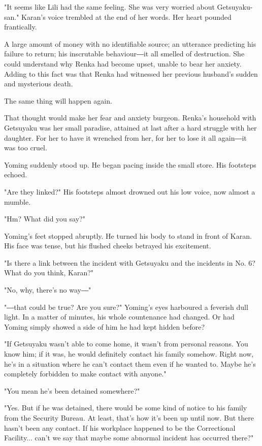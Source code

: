 "It seems like Lili had the same feeling. She was very worried about
Getsuyaku-san." Karan's voice trembled at the end of her words. Her
heart pounded frantically.

A large amount of money with no identifiable source; an utterance
predicting his failure to return; his inscrutable behaviour―it all
smelled of destruction. She could understand why Renka had become upset,
unable to bear her anxiety. Adding to this fact was that Renka had
witnessed her previous husband's sudden and mysterious death.

The same thing will happen again.

That thought would make her fear and anxiety burgeon. Renka's household
with Getsuyaku was her small paradise, attained at last after a hard
struggle with her daughter. For her to have it wrenched from her, for
her to lose it all again―it was too cruel.

Yoming suddenly stood up. He began pacing inside the small store. His
footsteps echoed.

"Are they linked?" His footsteps almost drowned out his low voice, now
almost a mumble.

"Hm? What did you say?"

Yoming's feet stopped abruptly. He turned his body to stand in front of
Karan. His face was tense, but his flushed cheeks betrayed his
excitement.

"Is there a link between the incident with Getsuyaku and the incidents
in No. 6? What do you think, Karan?"

"No, why, there's no way―"

"―that could be true? Are you sure?" Yoming's eyes harboured a feverish
dull light. In a matter of minutes, his whole countenance had changed.
Or had Yoming simply showed a side of him he had kept hidden before?

"If Getsuyaku wasn't able to come home, it wasn't from personal reasons.
You know him; if it was, he would definitely contact his family somehow.
Right now, he's in a situation where he can't contact them even if he
wanted to. Maybe he's completely forbidden to make contact with anyone."

"You mean he's been detained somewhere?"

"Yes. But if he was detained, there would be some kind of notice to his
family from the Security Bureau. At least, that's how it's been up until
now. But there hasn't been any contact. If his workplace happened to be
the Correctional Facility... can't we say that maybe some abnormal
incident has occurred there?"

